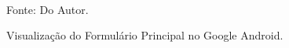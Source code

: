 \begin{figure}[!htb]
     \centering
     \caption[Formulário Principal - Google Android]{Visualização do Formulário Principal no Google Android.}
     \label{fig:MenuPrincipalAndroid}
     \\  Fonte: Do Autor.
\end{figure}

